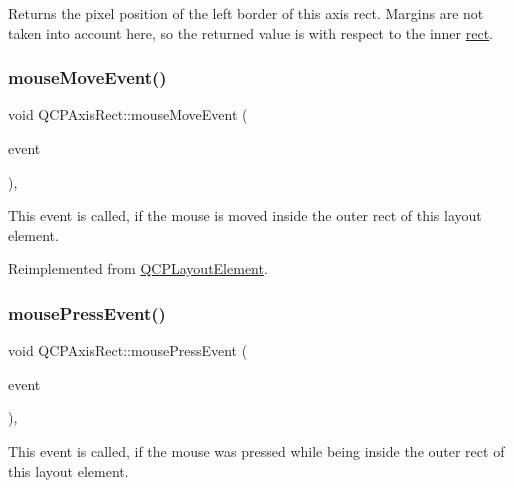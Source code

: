 Returns the pixel position of the left border of this axis rect. Margins are not taken into account here, so the returned value is with respect to the inner \mbox{\hyperlink{class_q_c_p_layout_element_a208effccfe2cca4a0eaf9393e60f2dd4}{rect}}. \mbox{\label{class_q_c_p_axis_rect_a4baf3d5dd69166788f6ceda0ea182c6e}} 
\subsubsection{\texorpdfstring{mouse\+Move\+Event()}{mouseMoveEvent()}}
{\footnotesize\ttfamily void Q\+C\+P\+Axis\+Rect\+::mouse\+Move\+Event (\begin{DoxyParamCaption}\item[{Q\+Mouse\+Event $\ast$}]{event }\end{DoxyParamCaption})\hspace{0.3cm}{\ttfamily [protected]}, {\ttfamily [virtual]}}

This event is called, if the mouse is moved inside the outer rect of this layout element. 

Reimplemented from \mbox{\hyperlink{class_q_c_p_layout_element_a14f4acf58cdb8dd2c6c571479c4c4a40}{Q\+C\+P\+Layout\+Element}}.

\mbox{\label{class_q_c_p_axis_rect_a77501dbeccdac7256f7979b05077c04e}} 
\subsubsection{\texorpdfstring{mouse\+Press\+Event()}{mousePressEvent()}}
{\footnotesize\ttfamily void Q\+C\+P\+Axis\+Rect\+::mouse\+Press\+Event (\begin{DoxyParamCaption}\item[{Q\+Mouse\+Event $\ast$}]{event }\end{DoxyParamCaption})\hspace{0.3cm}{\ttfamily [protected]}, {\ttfamily [virtual]}}

This event is called, if the mouse was pressed while being inside the outer rect of this layout element. 

